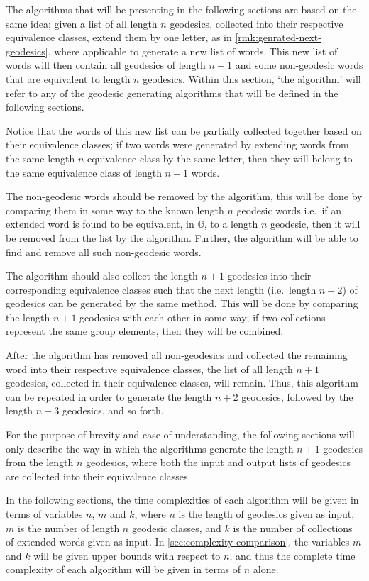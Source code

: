 The algorithms that will be presenting in the following sections are based on the same idea; given a list of all length $n$ geodesics, collected into their respective equivalence classes, extend them by one letter, as in \cref{rmk:genrated-next-geodesics}, where applicable to generate a new list of words.
This new list of words will then contain all geodesics of length $n+1$ and some non-geodesic words that are equivalent to length $n$ geodesics.
Within this section, `the algorithm' will refer to any of the geodesic generating algorithms that will be defined in the following sections.

Notice that the words of this new list can be partially collected together based on their equivalence classes; if two words were generated by extending words from the same length $n$ equivalence class by the same letter, then they will belong to the same equivalence class of length $n+1$ words.

The non-geodesic words should be removed by the algorithm, this will be done by comparing them in some way to the known length $n$ geodesic words i.e.\ if an extended word is found to be equivalent, in $\mathbb{G}$, to a length $n$ geodesic, then it will be removed from the list by the algorithm.
Further, the algorithm will be able to find and remove all such non-geodesic words.

The algorithm should also collect the length $n+1$ geodesics into their corresponding equivalence classes such that the next length (i.e.\ length $n+2$) of geodesics can be generated by the same method.
This will be done by comparing the length $n+1$ geodesics with each other in some way; if two collections represent the same group elements, then they will be combined.

After the algorithm has removed all non-geodesics and collected the remaining word into their respective equivalence classes, the list of all length $n+1$ geodesics, collected in their equivalence classes, will remain.
Thus, this algorithm can be repeated in order to generate the length $n+2$ geodesics, followed by the length $n+3$ geodesics, and so forth.

For the purpose of brevity and ease of understanding, the following sections will only describe the way in which the algorithms generate the length $n+1$ geodesics from the length $n$ geodesics, where both the input and output lists of geodesics are collected into their equivalence classes.

\begin{note*}
In the following sections, the time complexities of each algorithm will be given in terms of variables $n$, $m$ and $k$, where $n$ is the length of geodesics given as input, $m$ is the number of length $n$ geodesic classes, and $k$ is the number of collections of extended words given as input.
In \cref{sec:complexity-comparison}, the variables $m$ and $k$ will be given upper bounds with respect to $n$, and thus the complete time complexity of each algorithm will be given in terms of $n$ alone.
\end{note*}

